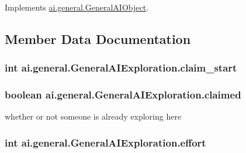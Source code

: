 Implements \hyperlink{classai_1_1general_1_1_general_a_i_object_adcb52382eaf3447f61640f6aca6225f6}{ai.general.GeneralAIObject}.



\subsection{Member Data Documentation}
\hypertarget{classai_1_1general_1_1_general_a_i_exploration_ae2aa8a6bcd54043e3b99c0900028ade1}{
\subsubsection[{claim\_\-start}]{\setlength{\rightskip}{0pt plus 5cm}int {\bf ai.general.GeneralAIExploration.claim\_\-start}}}
\label{classai_1_1general_1_1_general_a_i_exploration_ae2aa8a6bcd54043e3b99c0900028ade1}
\hypertarget{classai_1_1general_1_1_general_a_i_exploration_abdd49604e2c3c40dc7d8fdc830a608e2}{
\subsubsection[{claimed}]{\setlength{\rightskip}{0pt plus 5cm}boolean {\bf ai.general.GeneralAIExploration.claimed}}}
\label{classai_1_1general_1_1_general_a_i_exploration_abdd49604e2c3c40dc7d8fdc830a608e2}
whether or not someone is already exploring here \hypertarget{classai_1_1general_1_1_general_a_i_exploration_a8e960c790a7b8d63841a7e2eedea9f85}{
\subsubsection[{effort}]{\setlength{\rightskip}{0pt plus 5cm}int {\bf ai.general.GeneralAIExploration.effort}}}
